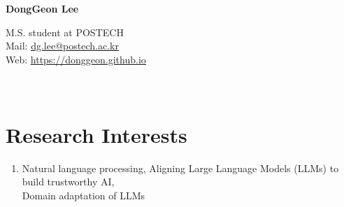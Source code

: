 \documentclass[letterpaper,11pt]{article}
\begin{document}
    \pagestyle{fancy}
    \thispagestyle{fancy}
    
    \begin{center}
        {\LARGE{\bf{DongGeon Lee}}\\}
    \end{center}
    
    \vspace{-14pt}
    
    \begin{center} 
        {M.S. student at POSTECH \\}
        {Mail: \underline{\href{mailto:dg.lee@postech.ac.kr}{dg.lee@postech.ac.kr}} \\}
        {Web: \underline{\href{https://donggeon.github.io/}{https://donggeon.github.io}}}
    \end{center}

    \section{\\Research Interests}
    \begin{enumerate}[noitemsep, leftmargin=*,label={}]
    \item{Natural language processing, Aligning Large Language Models (LLMs) to build trustworthy AI,\\ Domain adaptation of LLMs}
    \end{enumerate}
    
\end{document}
